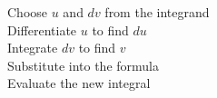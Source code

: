 \documentclass[preview]{standalone}
\begin{document}
Choose $u$ and $dv$ from the integrand\\Differentiate $u$ to find $du$\\Integrate $dv$ to find $v$\\Substitute into the formula\\Evaluate the new integral\\
\end{document}
